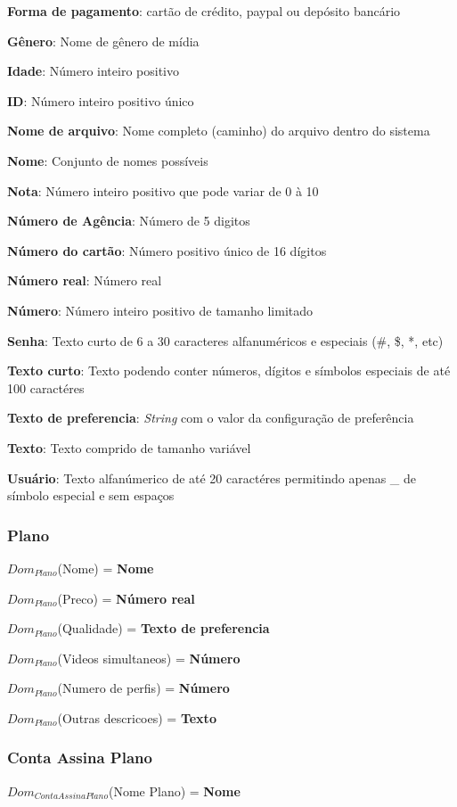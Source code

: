 \documentclass[12pt,a4paper]{article}
\newcommand{\createdomain}[3]{
    $Dom_{#1}$(#2) = {\bf #3}
}
\begin{document}
    {\bf Forma de pagamento}: cartão de crédito, paypal ou depósito bancário 
    
    {\bf Gênero}: Nome de gênero de mídia 
    
    {\bf Idade}: Número inteiro positivo 
    
    {\bf ID}: Número inteiro positivo único 
    
    {\bf Nome de arquivo}: Nome completo (caminho) do arquivo dentro do sistema 
    
    {\bf Nome}: Conjunto de nomes possíveis 
    
    {\bf Nota}: Número inteiro positivo que pode variar de 0 à 10 
    
    {\bf Número de Agência}: Número de 5 digitos 
    
    {\bf Número do cartão}: Número positivo único de 16 dígitos 
    
    {\bf Número real}: Número real 
    
    {\bf Número}: Número inteiro positivo de tamanho limitado 
    
    {\bf Senha}: Texto curto de 6 a 30 caracteres alfanuméricos e especiais (\#, \$, *, etc) 
    
    {\bf Texto curto}: Texto podendo conter números, dígitos e símbolos especiais de até 100 caractéres 
    
    {\bf Texto de preferencia}: {\it String} com o valor da configuração de preferência 
    
    {\bf Texto}: Texto comprido de tamanho variável 
    
    {\bf Usuário}: Texto alfanúmerico de até 20 caractéres permitindo apenas \_ de símbolo especial e sem espaços
    
    \singlespacing
    \subsubsection{Plano}
        \createdomain{Plano}{Nome}{Nome}

        \createdomain{Plano}{Preco}{Número real}

        \createdomain{Plano}{Qualidade}{Texto de preferencia}

        \createdomain{Plano}{Videos simultaneos}{Número}

        \createdomain{Plano}{Numero de perfis}{Número}

        \createdomain{Plano}{Outras descricoes}{Texto}


    \subsubsection{Conta Assina Plano}
        \createdomain{Conta Assina Plano}{Nome Plano}{Nome}
\end{document}
